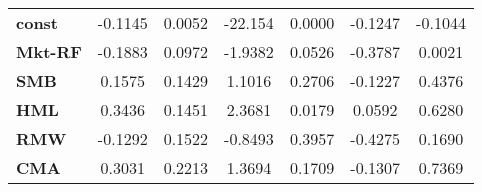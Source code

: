 \begin{center}
\begin{tabular}{lcccccc}
\midrule
\textbf{const}  &      -0.1145       &       0.0052       &     -22.154     &      0.0000      &      -0.1247      &      -0.1044       \\
\textbf{Mkt-RF} &      -0.1883       &       0.0972       &     -1.9382     &      0.0526      &      -0.3787      &       0.0021       \\
\textbf{SMB}    &       0.1575       &       0.1429       &      1.1016     &      0.2706      &      -0.1227      &       0.4376       \\
\textbf{HML}    &       0.3436       &       0.1451       &      2.3681     &      0.0179      &       0.0592      &       0.6280       \\
\textbf{RMW}    &      -0.1292       &       0.1522       &     -0.8493     &      0.3957      &      -0.4275      &       0.1690       \\
\textbf{CMA}    &       0.3031       &       0.2213       &      1.3694     &      0.1709      &      -0.1307      &       0.7369       \\
\bottomrule
\end{tabular}
\end{center}
